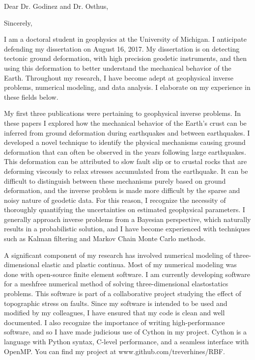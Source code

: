 \documentclass[11pt,a4paper,sans]{moderncv}
\begin{document}
\recipient{\ }{}
\date{June 28, 2017}
\opening{Dear Dr. Godinez and Dr. Osthus,}
\closing{Sincerely,}
\makelettertitle

I am a doctoral student in geophysics at the University of Michigan. I anticipate defending my dissertation on August 16, 2017. My dissertation is on detecting tectonic ground deformation, with high precision geodetic instruments, and then using this deformation to better understand the mechanical behavior of the Earth. Throughout my research, I have become adept at geophysical inverse problems, numerical modeling, and data analysis. I elaborate on my experience in these fields below.

My first three publications were pertaining to geophysical inverse problems. In these papers I explored how the mechanical behavior of the Earth's crust can be inferred from ground deformation during earthquakes and between earthquakes. I developed a novel technique to identify the physical mechanisms causing ground deformation that can often be observed in the years following large earthquakes. This deformation can be attributed to slow fault slip or to crustal rocks that are deforming viscously to relax stresses accumulated from the earthquake. It can be difficult to distinguish between these mechanisms purely based on ground deformation, and the inverse problem is made more difficult by the sparse and noisy nature of geodetic data. For this reason, I recognize the necessity of thoroughly quantifying the uncertainties on estimated geophysical parameters. I generally approach inverse problems from a Bayesian perspective, which naturally results in a probabilistic solution, and I have become experienced with techniques such as Kalman filtering and Markov Chain Monte Carlo methods.   

A significant component of my research has involved numerical modeling of three-dimensional elastic and plastic continua. Most of my numerical modeling was done with open-source finite element software. I am currently developing software for a meshfree numerical method of solving three-dimensional elastostatics problems. This software is part of a collaborative project studying the effect of topographic stress on faults. Since my software is intended to be used and modified by my colleagues, I have ensured that my code is clean and well documented. I also recognize the importance of writing high-performance software, and so I have made judicious use of Cython in my project. Cython is a language with Python syntax, C-level performance, and a seamless interface with OpenMP. You can find my project at www.github.com/treverhines/RBF.
\end{document}
